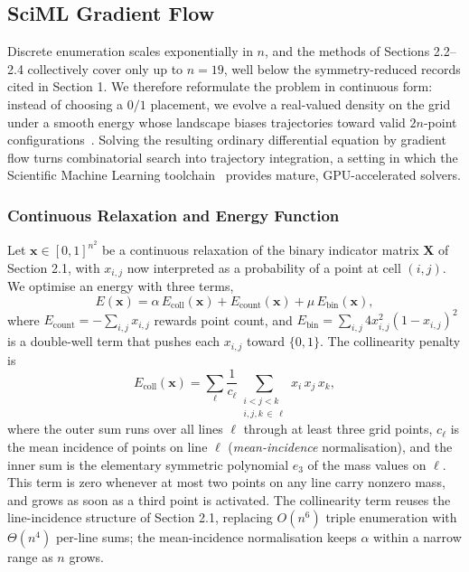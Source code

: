 \documentclass{article}
\theoremstyle{plain}
\theoremstyle{definition}
\theoremstyle{remark}
\begin{document}
\subsection{SciML Gradient Flow}
\label{sec:sciml}

Discrete enumeration scales exponentially in $n$, and the methods of Sections 2.2--2.4 collectively cover only up to $n = 19$, well below the symmetry-reduced records cited in Section 1. We therefore reformulate the problem in continuous form: instead of choosing a $0/1$ placement, we evolve a real-valued density on the grid under a smooth energy whose landscape biases trajectories toward valid $2n$-point configurations~\cite{schuetz2022combinatorial}. Solving the resulting ordinary differential equation by gradient flow turns combinatorial search into trajectory integration, a setting in which the Scientific Machine Learning toolchain~\cite{RackauckasNie2017,Karniadakis2021} provides mature, GPU-accelerated solvers.

\subsubsection{Continuous Relaxation and Energy Function}

Let $\mathbf{x} \in [0,1]^{n^2}$ be a continuous relaxation of the binary indicator matrix $\mathbf{X}$ of Section 2.1, with $x_{i,j}$ now interpreted as a probability of a point at cell $(i,j)$. We optimise an energy with three terms,
\begin{equation}
E(\mathbf{x}) = \alpha \, E_{\text{coll}}(\mathbf{x}) + E_{\text{count}}(\mathbf{x}) + \mu \, E_{\text{bin}}(\mathbf{x}),
\label{eq:sciml_energy}
\end{equation}
where $E_{\text{count}} = -\sum_{i,j} x_{i,j}$ rewards point count, and $E_{\text{bin}} = \sum_{i,j} 4 x_{i,j}^2 (1 - x_{i,j})^2$ is a double-well term that pushes each $x_{i,j}$ toward $\{0,1\}$. The collinearity penalty is
\begin{equation}
E_{\text{coll}}(\mathbf{x}) = \sum_{\ell} \frac{1}{c_{\ell}} \sum_{\substack{i < j < k \\ i,j,k \,\in\, \ell}} x_i\, x_j\, x_k,
\label{eq:sciml_ecoll}
\end{equation}
where the outer sum runs over all lines $\ell$ through at least three grid points, $c_{\ell}$ is the mean incidence of points on line $\ell$ (\textit{mean-incidence} normalisation), and the inner sum is the elementary symmetric polynomial $e_3$ of the mass values on $\ell$. This term is zero whenever at most two points on any line carry nonzero mass, and grows as soon as a third point is activated. The collinearity term reuses the line-incidence structure of Section 2.1, replacing $O(n^6)$ triple enumeration with $\Theta(n^4)$ per-line sums; the mean-incidence normalisation keeps $\alpha$ within a narrow range as $n$ grows.
\end{document}

